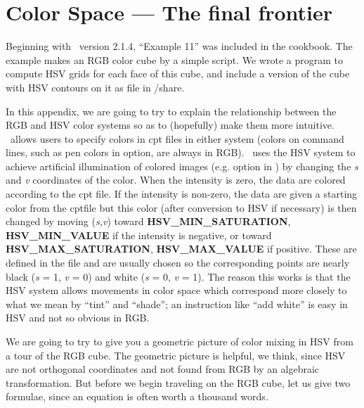 %
%
\chapter{Color Space --- The final frontier}
\thispagestyle{headings}

Beginning with \GMT\ version 2.1.4, ``Example 11'' was included in
the cookbook.  The example makes an RGB color cube by a simple
 script.  We wrote a program to compute HSV grids for
each face of this cube, and include a version of the cube with
HSV contours on it as file  in /share.


In this appendix, we are going to try to explain the relationship
between the RGB and HSV color systems so as to (hopefully) make
them more intuitive.  \GMT\ allows users to specify colors in cpt
files in either system (colors on command lines, such as pen colors
in  option, are always in RGB).  \GMT\ uses the HSV system to
achieve artificial illumination of colored images (e.g. 
option in ) by changing the {\it s} and {\it v}
coordinates of the color.  When the intensity is zero, the data
are colored according to the cpt file.  If the intensity is
non-zero, the data are given a starting color from the cptfile
but this color (after conversion to HSV if necessary) is then
changed by moving ({\it s,}{\it v}) toward {\bf HSV\_MIN\_SATURATION},
{\bf HSV\_MIN\_VALUE} if the intensity is negative, or toward
{\bf HSV\_MAX\_SATURATION}, {\bf HSV\_MAX\_VALUE} if positive.  These are
defined in the  file and are usually
chosen so the corresponding points are nearly black ({\it s} = 1,
{\it v} = 0) and white ({\it s} = 0, {\it v} = 1).
The reason this works is that the HSV system allows movements in
color space which correspond more closely to what we mean by
``tint'' and ``shade''; an instruction like ``add white'' is
easy in HSV and not so obvious in RGB.

We are going to try to give you a geometric picture of color
mixing in HSV from a tour of the RGB cube.  The geometric
picture is helpful, we think, since HSV are not orthogonal
coordinates and not found from RGB by an algebraic transformation.
But before we begin traveling on the RGB cube, let us give two
formulae, since an equation is often worth a thousand words. \\


